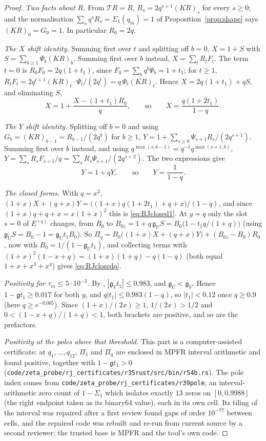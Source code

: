 \documentclass[11pt]{article}
\theoremstyle{plain}
\theoremstyle{definition}
\theoremstyle{remark}
\theoremstyle{plain}\newtheorem*{maintheorem}{Main Theorem}
\begin{document}
\begin{proof}
\emph{Two facts about $R$.} From $\mathcal TR=R$, $R_s=2q^{s+1}(KR)_s$ for every $s\ge0$; and the
normalisation $\sum_sq^sR_s=\Sigma_1(q_m)=1$ of Proposition~\ref{prop:shape} says $(KR)_0=G_0=1$. In
particular $R_0=2q$.

\emph{The $X$ shift identity.} Summing first over $t$ and splitting off $b=0$,
$X=1+S$ with $S=\sum_{b\ge1}\Psi_b(KR)_b$. Summing first over $b$ instead, $X=\sum_tR_tF_t$. The
term $t=0$ is $R_0F_0=2q(1+t_1)$, since $F_0=\sum_bq^b\Psi_b=1+t_1$; for $t\ge1$,
$R_tF_t=2q^{t+1}(KR)_t\cdot\Psi_t/(2q^t)=q\,\Psi_t(KR)_t$. Hence $X=2q(1+t_1)+qS$, and eliminating
$S$,
\[
   X=1+\frac{X-(1+t_1)R_0}{q},\qquad\text{so}\qquad X=\frac{q(1+2t_1)}{1-q}.
\]

\emph{The $Y$ shift identity.} Splitting off $b=0$ and using $G_b=(KR)_{b-1}=R_{b-1}/(2q^b)$ for
$b\ge1$, $Y=1+\sum_{s\ge0}\Psi_{s+1}R_s/(2q^{s+1})$. Summing first over $b$ instead, and using
$q^{\max(s,b-1)}=q^{-1}q^{\max(s+1,b)}$, $Y=\sum_sR_sF_{s+1}/q=\sum_sR_s\Psi_{s+1}/(2q^{s+2})$. The
two expressions give
\[
   Y=1+qY,\qquad\text{so}\qquad Y=\frac1{1-q}.
\]

\emph{The closed forms.} With $q=x^2$,
$(1+x)X+(q+x)Y=\bigl((1+x)q(1+2t_1)+q+x\bigr)/(1-q)$, and since
$(1+x)q+q+x=x(1+x)^2$ this is \eqref{eq:RJclosed1}. At $y=q$ only the slot $s=0$ of $E^{(q)}$
changes, from $B_0$ to $B_{0z}=1+q\,\mathfrak g_US=B_0\bigl(1-t_1q/(1+q)\bigr)$ (using
$\mathfrak g_US=B_0-1=\mathfrak g_Ut_1B_0$). So
$\Pi_q=B_0\bigl((1+x)X+(q+x)Y\bigr)+(B_{0z}-B_0)R_0$, now with $B_0=1/(1-\mathfrak g_Ut_1)$, and
collecting terms with $(1+x)^2(1-x+q)=(1+x)(1+q)-q(1-q)$ (both equal $1+x+x^3+x^4$) gives
\eqref{eq:RJclosedq}.

\emph{Positivity for $\tau_m\le5\cdot10^{-3}$.} By {\cite[Corollary ``the gate closes'', \textup{app:gate}]{Bonfioli2026bB}}, $|\mathfrak g_Vt_1|\le0.983$,
and $\mathfrak g_U<\mathfrak g_V$. Hence $1-\mathfrak gt_1\ge0.017$ for both $y$, and
$q|t_1|\le0.983(1-q)$, so $|t_1|<0.12$ once $q\ge0.9$ (here $q\ge e^{-0.005}$). Since
$(1+x)/(2x)\ge1$, $1/(2x)>1/2$ and $0<(1-x+q)/(1+q)<1$, both brackets are positive, and so are the
prefactors.

\emph{Positivity at the poles above that threshold.} This part is a computer-assisted certificate:
at $q_1,\dots,q_{12}$, $\Pi_1$ and $\Pi_q$ are enclosed in MPFR interval arithmetic and found positive,
together with $1-\mathfrak gt_1>0$ (\texttt{code/zeta\_probe/rj\_certificates/r35rust/src/bin/r54b.rs}). The pole
index comes from \texttt{code/zeta\_probe/rj\_certificates/r39pole}, an interval-arithmetic zero count
of $1-\Sigma_1$ which isolates exactly $13$ zeros on $[0,0.9988]$ \textup{(}the right endpoint
taken as its binary64 value\textup{)}, each in its own cell. Its tiling of the interval was repaired
after a first review found gaps of order $10^{-77}$ between cells, and the repaired code was rebuilt
and re-run from current source by a second reviewer; the trusted base is MPFR and the tool's own code.
\end{proof}
\end{document}
